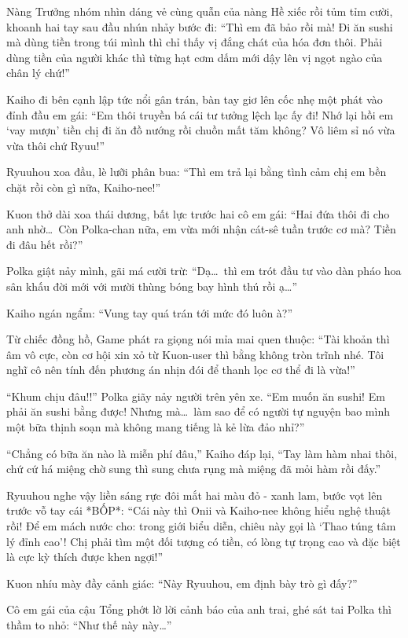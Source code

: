 \documentclass[../main.tex]{subfiles}
\begin{document}
Nàng Trưởng nhóm nhìn dáng vẻ cùng quẫn của nàng Hề xiếc rồi tủm tỉm cười, khoanh hai tay sau đầu nhún nhảy bước đi: ``Thì em đã bảo rồi mà! Đi ăn sushi mà dùng tiền trong túi mình thì chỉ thấy vị đắng chát của hóa đơn thôi. Phải dùng tiền của người khác thì từng hạt cơm dấm mới dậy lên vị ngọt ngào của chân lý chứ!''

Kaiho đi bên cạnh lập tức nổi gân trán, bàn tay giơ lên cốc nhẹ một phát vào đỉnh đầu em gái: ``Em thôi truyền bá cái tư tưởng lệch lạc ấy đi! Nhớ lại hồi em `vay mượn' tiền chị đi ăn đồ nướng rồi chuồn mất tăm không? Vô liêm sỉ nó vừa vừa thôi chứ Ryuu!''

Ryuuhou xoa đầu, lè lưỡi phân bua: ``Thì em trả lại bằng tình cảm chị em bền chặt rồi còn gì nữa, Kaiho-nee!''

Kuon thở dài xoa thái dương, bất lực trước hai cô em gái: ``Hai đứa thôi đi cho anh nhờ\dots\ Còn Polka-chan nữa, em vừa mới nhận cát-sê tuần trước cơ mà? Tiền đi đâu hết rồi?''

Polka giật nảy mình, gãi má cười trừ: ``Dạ\dots\ thì em trót đầu tư vào dàn pháo hoa sân khấu đời mới với mười thùng bóng bay hình thú rồi ạ\dots''

Kaiho ngán ngẩm: ``Vung tay quá trán tới mức đó luôn à?''

Từ chiếc đồng hồ, Game phát ra giọng nói mỉa mai quen thuộc: ``Tài khoản thì âm vô cực, còn cơ hội xin xỏ từ Kuon-user thì bằng không tròn trĩnh nhé. Tôi nghĩ cô nên tính đến phương án nhịn đói để thanh lọc cơ thể đi là vừa!''

``Khum chịu đâu!!'' Polka giãy nảy người trên yên xe. ``Em muốn ăn sushi! Em phải ăn sushi bằng được! Nhưng mà\dots\ làm sao để có người tự nguyện bao mình một bữa thịnh soạn mà không mang tiếng là kẻ lừa đảo nhỉ?''

``Chẳng có bữa ăn nào là miễn phí đâu,'' Kaiho đáp lại, ``Tay làm hàm nhai thôi, chứ cứ há miệng chờ sung thì sung chưa rụng mà miệng đã mỏi hàm rồi đấy.''

Ryuuhou nghe vậy liền sáng rực đôi mắt hai màu đỏ - xanh lam, bước vọt lên trước vỗ tay cái *BỐP*: ``Cái này thì Onii và Kaiho-nee không hiểu nghệ thuật rồi! Để em mách nước cho: trong giới biểu diễn, chiêu này gọi là `Thao túng tâm lý đỉnh cao'! Chị phải tìm một đối tượng có tiền, có lòng tự trọng cao và đặc biệt là cực kỳ thích được khen ngợi!''

Kuon nhíu mày đầy cảnh giác: ``Này Ryuuhou, em định bày trò gì đấy?''

Cô em gái của cậu Tổng phớt lờ lời cảnh báo của anh trai, ghé sát tai Polka thì thầm to nhỏ: ``Như thế này này\dots''
\end{document}
